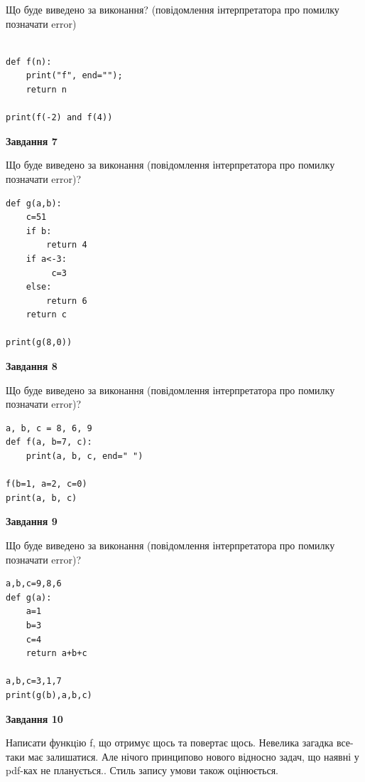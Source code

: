 \documentclass[12pt, ukrainian]{article}
\begin{document}
{\begin {large}
Що буде виведено за виконання? (повідомлення інтерпретатора про помилку позначати error)\par
\begin{verbatim}

def f(n):
    print("f", end="");
    return n

print(f(-2) and f(4))
\end{verbatim}

{\begin {center}\textbf{Завдання 7}\end {center}}

Що буде виведено за виконання (повідомлення інтерпретатора про помилку позначати error)?\par
\begin{verbatim}
def g(a,b):
    c=51
    if b:
        return 4
    if a<-3:
         c=3
    else: 
        return 6
    return c

print(g(8,0))
\end{verbatim}

{\begin {center}\textbf{Завдання 8}\end {center}}

Що буде виведено за виконання (повідомлення інтерпретатора про помилку позначати error)?\par
\begin{verbatim}
a, b, c = 8, 6, 9
def f(a, b=7, c):
    print(a, b, c, end=" ")

f(b=1, a=2, c=0)
print(a, b, c)
\end{verbatim}

{\begin {center}\textbf{Завдання 9}\end {center}}

Що буде виведено за виконання (повідомлення інтерпретатора про помилку позначати error)?\par
\begin{verbatim}
a,b,c=9,8,6
def g(a):
    a=1
    b=3
    c=4
    return a+b+c

a,b,c=3,1,7
print(g(b),a,b,c)
\end{verbatim}

{\begin {center}\textbf{Завдання 10}\end {center}}


Написати функцiю f, що отримує щось та повертає щось. Невелика загадка все-таки має залишатися. Але нічого принципово нового відносно задач, що наявні у pdf-ках не планується.. Стиль запису умови також оцінюється.\par
\end {large}}
\newpage
\end{document}
